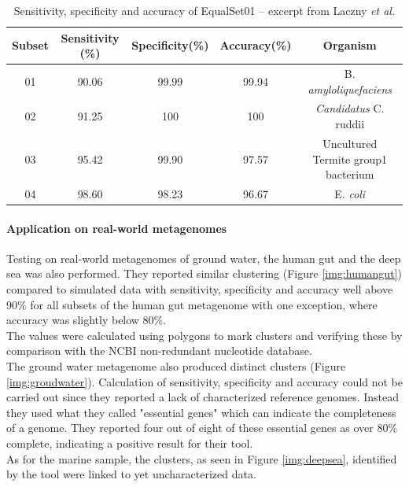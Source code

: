 \documentclass[twocolumn]{bmcart}%
\begin{document}
\begin{table}[h]
	\centering
	\caption{Sensitivity, specificity and accuracy of EqualSet01 -- excerpt from Laczny \textit{et al.}\cite{Laczny2014}}
	\begin{tabular}{c|c|c|c|c}
		Subset&Sensitivity (\%)&Specificity(\%)&Accuracy(\%)&Organism\\
		\hline
		01&90.06&99.99&99.94&B. \textit{amyloliquefaciens}\\
		02&91.25&100&100&\textit{Candidatus} C. ruddii\\
		03&95.42&99.90&97.57&Uncultured Termite group1 bacterium\\
		04&98.60&98.23&96.67&E. \textit{coli}
	\end{tabular}
\label{tab:sens-spec-acc1}
\end{table}%
\paragraph*{Application on real-world metagenomes}
Testing on real-world metagenomes of ground water\cite{Wrighton1661}, the human gut \cite{Arumugam2011} and the deep sea\cite{Konstantinidis15082009} was also performed. They reported similar clustering (Figure \ref{img:humangut}) compared to simulated data with sensitivity, specificity and accuracy well above 90\% for all subsets of the human gut metagenome with one exception, where accuracy was slightly below 80\%.\\
The values were calculated using polygons to mark clusters and verifying these by comparison with the NCBI non-redundant nucleotide database.\\
The ground water metagenome also produced distinct clusters (Figure \ref{img:groudwater}). Calculation of sensitivity, specificity and accuracy could not be carried out since they reported a lack of characterized reference genomes. Instead they used what they called "essential genes" which can indicate the completeness of a genome. They reported four out of eight of these essential genes as over 80\% complete, indicating a positive result for their tool.\\
As for the marine sample, the clusters, as seen in Figure \ref{img:deepsea}, identified by the tool were linked to yet  uncharacterized data.
\end{document}
